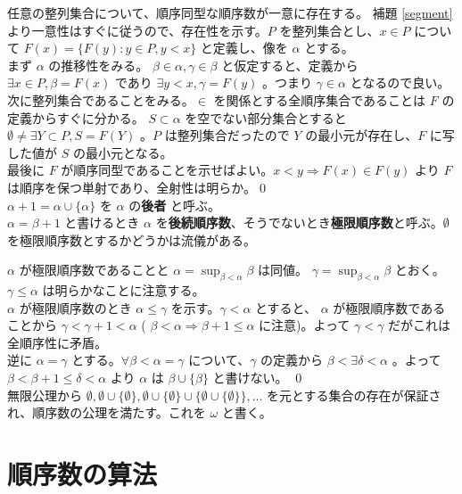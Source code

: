 \documentclass[dvipdfmx,a4paper]{jsreport}
\theoremstyle{definition}
\begin{document}
\thm 任意の整列集合について、順序同型な順序数が一意に存在する。
\prf 補題 \ref{segment} より一意性はすぐに従うので、存在性を示す。$P$ を整列集合とし、$x \in P$ について $F(x)=\{F(y) \colon y \in P,y<x\}$ と定義し、像を $\alpha$ とする。\\
まず $\alpha$ の推移性をみる。 $\beta \in \alpha,\gamma \in \beta$ と仮定すると、定義から $\exists x \in P,\beta=F(x)$ であり $\exists y<x,\gamma=F(y)$ 。つまり $\gamma \in \alpha$ となるので良い。\\
次に整列集合であることをみる。$\in$ を関係とする全順序集合であることは $F$ の定義からすぐに分かる。 $S \subset \alpha$ を空でない部分集合とすると $\emptyset \neq \exists Y \subset P,S=F(Y)$ 。$P$ は整列集合だったので $Y$ の最小元が存在し、$F$ に写した値が $S$ の最小元となる。\\
最後に $F$ が順序同型であることを示せばよい。$x<y \Rightarrow F(x) \in F(y)$ より $F$ は順序を保つ単射であり、全射性は明らか。\qed \\

 $\alpha+1=\alpha\cup \{\alpha\}$ を $\alpha$ の\textbf{後者} と呼ぶ。\\
$\alpha=\beta+1$ と書けるとき $\alpha$ を\textbf{後続順序数}、そうでないとき\textbf{極限順序数}と呼ぶ。$\emptyset$ を極限順序数とするかどうかは流儀がある。

\lem $\alpha$ が極限順序数であることと $\alpha=\sup_{\beta<\alpha}\beta$ は同値。
\prf $\gamma=\sup_{\beta<\alpha}\beta$ とおく。 $\gamma \leq \alpha$ は明らかなことに注意する。\\
$\alpha$ が極限順序数のとき $\alpha \leq \gamma$ を示す。$\gamma<\alpha$ とすると、 $\alpha$ が極限順序数であることから $\gamma<\gamma+1<\alpha$ ( $\beta<\alpha \Rightarrow \beta+1 \leq \alpha$ に注意)。よって $\gamma<\gamma$ だがこれは全順序性に矛盾。\\
逆に $\alpha=\gamma$ とする。$\forall \beta< \alpha=\gamma$ について、$\gamma$ の定義から $\beta<\exists \delta<\alpha$ 。よって $\beta<\beta+1 \leq \delta<\alpha$ より $\alpha$ は $\beta\cup \{\beta\}$ と書けない。 \qed \\

 無限公理から $\emptyset,\emptyset\cup\{\emptyset\},\emptyset\cup\{\emptyset\}\cup\{\emptyset\cup\{\emptyset\}\},\ldots$ を元とする集合の存在が保証され、順序数の公理を満たす。これを $\omega$ と書く。 \\

\section{順序数の算法}
\end{document}
